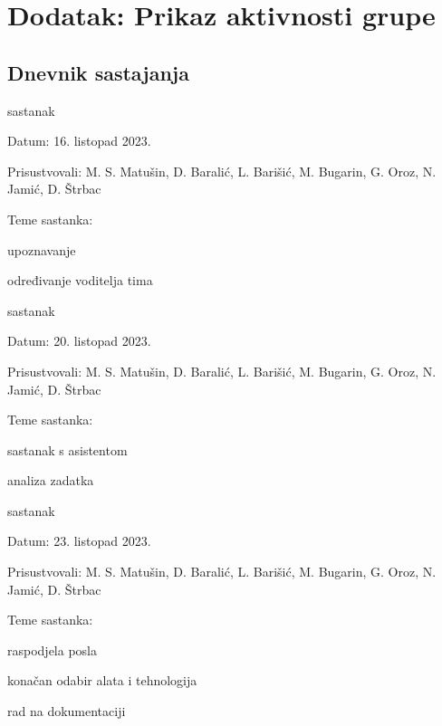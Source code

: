 \chapter*{Dodatak: Prikaz aktivnosti grupe}
		
		\section*{Dnevnik sastajanja}
		
		
		\begin{packed_enum}
			\item  sastanak
			
			\item[] \begin{packed_item}
				\item Datum: 16. listopad 2023.
				\item Prisustvovali: M. S. Matušin, D. Baralić, L. Barišić, M. Bugarin, G. Oroz, N. Jamić, D. Štrbac
				\item Teme sastanka:
				\begin{packed_item}
					\item  upoznavanje
					\item  određivanje voditelja tima
				\end{packed_item}
			\end{packed_item}
			
			\item  sastanak
			\item[] \begin{packed_item}
				\item Datum: 20. listopad 2023.
				\item Prisustvovali: M. S. Matušin, D. Baralić, L. Barišić, M. Bugarin, G. Oroz, N. Jamić, D. Štrbac
				\item Teme sastanka:
				\begin{packed_item}
					\item  sastanak s asistentom
					\item  analiza zadatka
				\end{packed_item}
			\end{packed_item}
			
			\item  sastanak
			\item[] \begin{packed_item}
				\item Datum: 23. listopad 2023.
				\item Prisustvovali: M. S. Matušin, D. Baralić, L. Barišić, M. Bugarin, G. Oroz, N. Jamić, D. Štrbac
				\item Teme sastanka:
				\begin{packed_item}
					\item  raspodjela posla
					\item  konačan odabir alata i tehnologija
					\item rad na dokumentaciji
				\end{packed_item}
			\end{packed_item}
			

\end{packed_enum}
